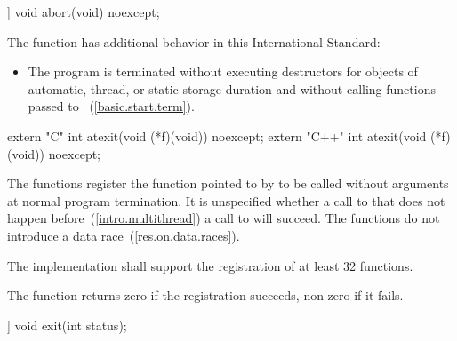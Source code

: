 %
\begin{itemdecl}
[[noreturn]] void abort(void) noexcept;
\end{itemdecl}

\begin{itemdescr}
\pnum
The function
has additional behavior in this International Standard:

\begin{itemize}
\item
The program is terminated without executing destructors for objects of
automatic, thread, or static storage
duration and without calling functions passed to
~(\ref{basic.start.term}).
%
%
\end{itemize}
\end{itemdescr}

\begin{itemdecl}
extern "C" int atexit(void (*f)(void)) noexcept;
extern "C++" int atexit(void (*f)(void)) noexcept;
\end{itemdecl}

\begin{itemdescr}
\pnum
\effects
The
functions register the function pointed to by 
to be called without arguments at normal program termination.
It is unspecified whether a call to  that does not
happen before~(\ref{intro.multithread}) a call to  will succeed.
\enternote The  functions do not introduce a data
race~(\ref{res.on.data.races}). \exitnote

\pnum
\implimits
The implementation shall support the registration of at least 32 functions.

\pnum
\returns
The
function returns zero if the registration succeeds,
non-zero if it fails.
\end{itemdescr}

%
\begin{itemdecl}
[[noreturn]] void exit(int status);
\end{itemdecl}

